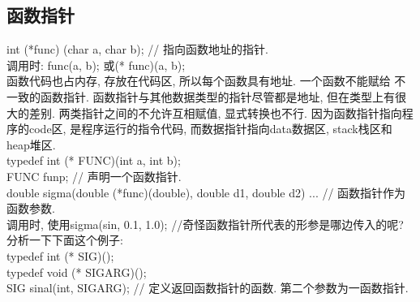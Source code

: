 \documentclass[a4paper,10pt,english]{article}
\begin{document}
\subsection {函数指针}
int (*func) (char a, char b); // 指向函数地址的指针. \\
调用时: func(a, b); 或(* func)(a, b);\\
函数代码也占内存, 存放在代码区, 所以每个函数具有地址. 一个函数不能赋给 不一致的函数指针. 函数指针与其他数据类型的指针尽管都是地址, 但在类型上有很大的差别. 两类指针之间的不允许互相赋值, 显式转换也不行. 因为函数指针指向程序的code区, 是程序运行的指令代码, 而数据指针指向data数据区, stack栈区和heap堆区. \\
typedef int (* FUNC)(int a, int b); \\
FUNC funp; // 声明一个函数指针. \\
double sigma(double (*func)(double), double d1, double d2) {...} // 函数指针作为函数参数. \\
调用时, 使用sigma(sin, 0.1, 1.0); //奇怪函数指针所代表的形参是哪边传入的呢? \\

分析一下下面这个例子: \\
typedef int (* SIG)(); \\
typedef void (* SIGARG)();\\
SIG sinal(int, SIGARG); // 定义返回函数指针的函数. 第二个参数为一函数指针.
\end{document}
